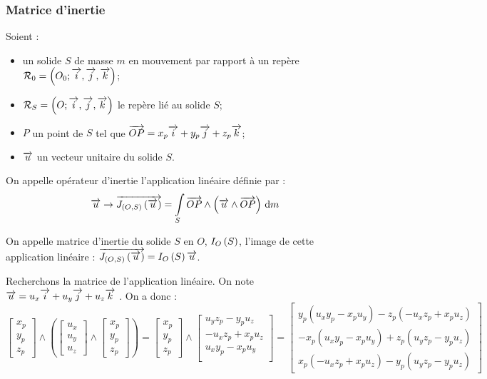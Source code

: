 \documentclass[10pt,fleqn]{article} %
\begin{document}
\subsubsection{Matrice d'inertie \label{def_inert}}

\begin{defi}
Soient : 
\begin{itemize}
\item un solide $S$ de masse $m$ en mouvement par rapport à un repère $\mathcal{R}_0=\left(O_0;\overrightarrow{i},\overrightarrow{j},\overrightarrow{k} \right)$;
\item $\mathcal{R}_S=\left(O;\overrightarrow{i},\overrightarrow{j},\overrightarrow{k} \right)$ le repère lié au solide $S$;
\item $P$ un point de $S$ tel que $\overrightarrow{OP}=x_p\overrightarrow{i}+y_p\overrightarrow{j}+z_p\overrightarrow{k}$;
\item $\overrightarrow{u}$ un vecteur unitaire du solide $S$.
\end{itemize}

On appelle opérateur d'inertie l'application linéaire définie par :
$$
\overrightarrow{u} \rightarrow \overrightarrow{J_{\left(O,S\right)}\left(\overrightarrow{u}\right)} 
= \int\limits_{S} \overrightarrow{OP}\wedge \left(\overrightarrow{u}\wedge \overrightarrow{OP}\right)\,\text{d} m
$$

On appelle matrice d'inertie du solide $S$ en $O$, $I_{O}\left( S\right)$, l'image de cette application linéaire : $\overrightarrow{J_{\left(O,S\right)}\left(\overrightarrow{u}\right)}  = I_{O}\left( S\right) \overrightarrow{u}$.
 
\end{defi}


Recherchons la matrice de l'application linéaire. On note $\overrightarrow{u}=u_x\overrightarrow{i}+u_y\overrightarrow{j}+u_z\overrightarrow{k}$ .
On a donc :
$$
\begin{bmatrix}
x_p \\ y_p \\ z_p
\end{bmatrix}
\wedge
\left(
\begin{bmatrix}
u_x \\ u_y \\ u_z
\end{bmatrix}
\wedge
\begin{bmatrix}
x_p \\ y_p \\ z_p
\end{bmatrix}
\right)
=
\begin{bmatrix}
x_p \\ y_p \\ z_p
\end{bmatrix}
\wedge
\begin{bmatrix}
u_y z_p - y_p u_z \\
-u_x z_p + x_p u_z \\
u_x y_p - x_p u_y \\
\end{bmatrix}
=
\begin{bmatrix}
 y_p \left( u_x y_p - x_p u_y\right)
 -z_p \left( -u_x z_p + x_p u_z \right) \\
 -x_p \left(u_x y_p - x_p u_y \right)
 +z_p \left(u_y z_p - y_p u_z \right) \\
 x_p \left( -u_x z_p + x_p u_z\right)
 -y_p \left( u_y z_p - y_p u_z\right)
\end{bmatrix}
$$
\end{document}
